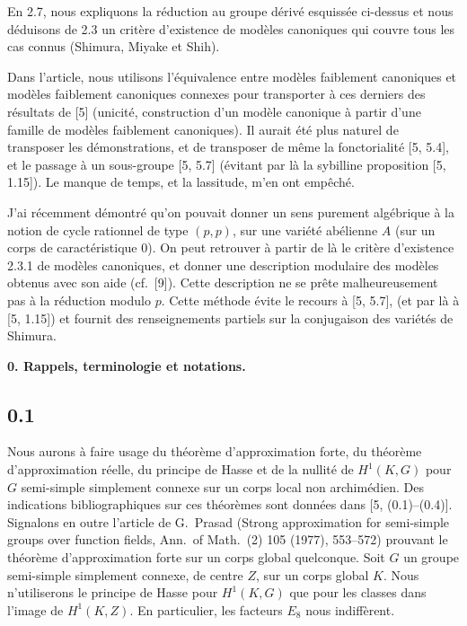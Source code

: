 \documentclass[12pt,a4paper]{article}
\theoremstyle{plain}
\theoremstyle{definition}
\theoremstyle{remark}
\begin{document}
En 2.7, nous expliquons la r\'eduction au groupe d\'eriv\'e esquiss\'ee ci-dessus et nous d\'eduisons de 2.3 un crit\`ere d'existence de mod\`eles canoniques qui couvre tous les cas connus (Shimura, Miyake et Shih).

Dans l'article, nous utilisons l'\'equivalence entre mod\`eles faiblement canoniques et mod\`eles faiblement canoniques connexes pour transporter \`a ces derniers des r\'esultats de [5] (unicit\'e, construction d'un mod\`ele canonique \`a partir d'une famille de mod\`eles faiblement canoniques). Il aurait \'et\'e plus naturel de transposer les d\'emonstrations, et de transposer de m\^eme la fonctorialit\'e [5, 5.4], et le passage \`a un sous-groupe [5, 5.7] (\'evitant par l\`a la sybilline proposition [5, 1.15]). Le manque de temps, et la lassitude, m'en ont emp\^ech\'e.

J'ai r\'ecemment d\'emontr\'e qu'on pouvait donner un sens purement alg\'ebrique \`a la notion de cycle rationnel de type $(p,p)$, sur une vari\'et\'e ab\'elienne $A$ (sur un corps de caract\'eristique 0). On peut retrouver \`a partir de l\`a le crit\`ere d'existence 2.3.1 de mod\`eles canoniques, et donner une description modulaire des mod\`eles obtenus avec son aide (cf.~[9]). Cette description ne se pr\^ete malheureusement pas \`a la r\'eduction modulo $p$. Cette m\'ethode \'evite le recours \`a [5, 5.7], (et par l\`a \`a [5, 1.15]) et fournit des renseignements partiels sur la conjugaison des vari\'et\'es de Shimura.

\vspace{0.5cm}
\noindent\textbf{0. Rappels, terminologie et notations.}

\subsection*{0.1}

Nous aurons \`a faire usage du th\'eor\`eme d'approximation forte, du th\'eor\`eme d'approximation r\'eelle, du principe de Hasse et de la nullit\'e de $H^1(K,G)$ pour $G$ semi-simple simplement connexe sur un corps local non archim\'edien. Des indications bibliographiques sur ces th\'eor\`emes sont donn\'ees dans [5, (0.1)--(0.4)]. Signalons en outre l'article de G.~Prasad (Strong approximation for semi-simple groups over function fields, Ann.~of Math.~(2) 105 (1977), 553--572) prouvant le th\'eor\`eme d'approximation forte sur un corps global quelconque. Soit $G$ un groupe semi-simple simplement connexe, de centre $Z$, sur un corps global $K$. Nous n'utiliserons le principe de Hasse pour $H^1(K,G)$ que pour les classes dans l'image de $H^1(K,Z)$. En particulier, les facteurs $E_8$ nous indiff\`erent.
\end{document}
